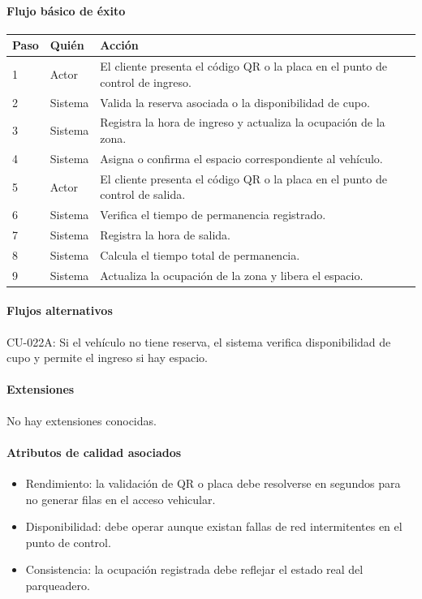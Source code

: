 \paragraph{Flujo básico de éxito}
\begin{longtable}{P{1.1cm}P{1.8cm}P{10.5cm}}
\toprule
\textbf{Paso} & \textbf{Quién} & \textbf{Acción}\\
\midrule
{} & Actor & El cliente presenta el código QR o la placa en el punto de control de ingreso.\\
2 & Sistema & Valida la reserva asociada o la disponibilidad de cupo.\\
3 & Sistema & Registra la hora de ingreso y actualiza la ocupación de la zona.\\
4 & Sistema & Asigna o confirma el espacio correspondiente al vehículo.\\
5 & Actor & El cliente presenta el código QR o la placa en el punto de control de salida.\\
6 & Sistema & Verifica el tiempo de permanencia registrado.\\
7 & Sistema & Registra la hora de salida.\\
8 & Sistema & Calcula el tiempo total de permanencia.\\
9 & Sistema & Actualiza la ocupación de la zona y libera el espacio.\\
\bottomrule
\end{longtable}

\paragraph{Flujos alternativos}
CU-022A: Si el vehículo no tiene reserva, el sistema verifica disponibilidad de cupo y permite el ingreso si hay espacio.

\paragraph{Extensiones}
No hay extensiones conocidas.

\paragraph{Atributos de calidad asociados}
\begin{itemize}[leftmargin=1.4em, topsep=1pt]
  \item Rendimiento: la validación de QR o placa debe resolverse en segundos para no generar filas en el acceso vehicular.
  \item Disponibilidad: debe operar aunque existan fallas de red intermitentes en el punto de control.
  \item Consistencia: la ocupación registrada debe reflejar el estado real del parqueadero.
\end{itemize}

